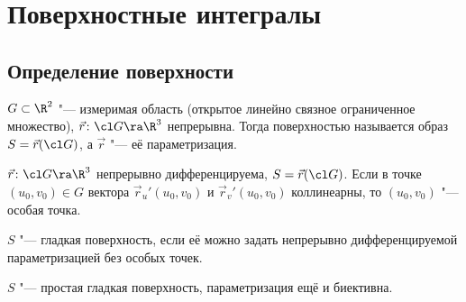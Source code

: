 \chapter{Поверхностные интегралы}

\section{Определение поверхности}

\begin{Def}
	$G \subset \R^2$ "--- измеримая область (открытое линейно связное ограниченное множество),
	$\vec r\colon \cl G \ra \R^3$ непрерывна.
	Тогда поверхностью называется образ $S = \vec r(\cl G)$, а $\vec r$ "--- её параметризация.
\end{Def}

\begin{Def}
	$\vec r\colon \cl G \ra \R^3$ непрерывно дифференцируема, $S = \vec r(\cl G)$.
	Если в точке $(u_0, v_0) \in G$ вектора $\vec r_u'(u_0, v_0)$ и $\vec r_v'(u_0, v_0)$ коллинеарны, то
	$(u_0, v_0)$ "--- особая точка.
\end{Def}

\begin{Def}
	$S$ "--- гладкая поверхность, если её можно задать непрерывно дифференцируемой параметризацией без особых точек.
\end{Def}

\begin{Def}
	$S$ "--- простая гладкая поверхность, параметризация ещё и биективна.
\end{Def}

